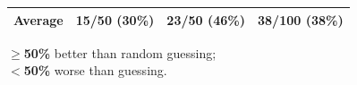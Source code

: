 \begin{table}[t]
\begin{threeparttable}
\begin{tabular}{cccc}
\midrule
\textbf{Average} & \cellcolor{red!8}15/50 (30\%) & \cellcolor{red!7}23/50 (46\%) & \cellcolor{red!14}38/100 (38\%) \\
\bottomrule
\end{tabular}
    \begin{tablenotes}
      \footnotesize
      \item \colorbox{green!15}{\textbf{$\geq$50\%}} better than random guessing;\\
\colorbox{red!15}{\textbf{$<$50\%}} worse than guessing.
    \end{tablenotes}
  \end{threeparttable}
\end{table}

